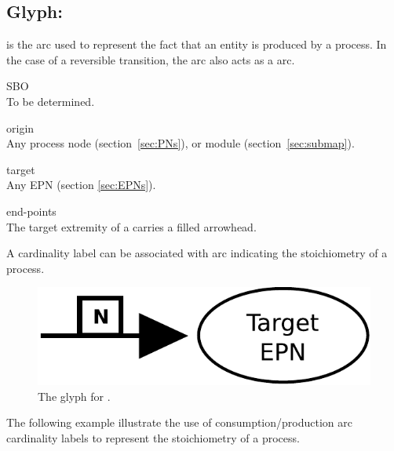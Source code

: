 \subsection{Glyph: }\label{sec:production}

 is the arc used to represent the fact that an entity is 
produced by a process. In the case of a reversible transition, the 
 arc also acts as a  arc.

\begin{glyphDescription}
 \item[SBO]\mbox{}\\ To be determined.
 \item[origin]\mbox{}\\ Any process node (section~\ref{sec:PNs}), or module (section~\ref{sec:submap}).
 \item[target]\mbox{}\\ Any EPN (section \ref{sec:EPNs}).
 \item[end-points]\mbox{}\\ The target extremity of a  carries a filled arrowhead.
 \end{glyphDescription}

A cardinality label can be associated with  arc indicating the stoichiometry of a process.

\begin{figure}[H]
  \centering
  \includegraphics[scale = 0.5]{images/production}
  \caption{The \PD glyph for .}
  \label{fig:production}
\end{figure}

The following example illustrate the use of consumption/production arc cardinality labels to represent the stoichiometry of a process.

\begin{center}
\end{center}

\normalcolor
